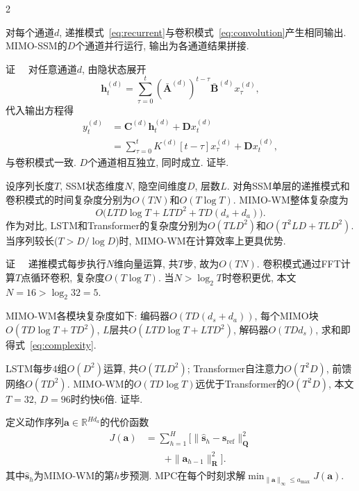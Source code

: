\begin{multicols}{2}
\begin{Thm}
\label{thm:equiv}
对每个通道$d$, 递推模式~\eqref{eq:recurrent}与卷积模式~\eqref{eq:convolution}产生相同输出.
MIMO-SSM的$D$个通道并行运行, 输出为各通道结果拼接.
\end{Thm}

{证}~~
对任意通道$d$, 由隐状态展开
\begin{equation}
{\bm h}_t^{(d)} = \sum_{\tau=0}^{t} (\bar{{\bm A}}^{(d)})^{t-\tau} \bar{{\bm B}}^{(d)} x_\tau^{(d)},
\end{equation}
代入输出方程得
\begin{equation}
\begin{aligned}
y_t^{(d)} &= {\bm C}^{(d)}{\bm h}_t^{(d)} + {\bm D}x_t^{(d)} \\
&= \sum_{\tau=0}^{t} K^{(d)}[t{-}\tau] x_\tau^{(d)} + {\bm D}x_t^{(d)},
\end{aligned}
\end{equation}
与卷积模式一致. $D$个通道相互独立, 同时成立. 证毕.
\begin{Thm}
\label{thm:complexity}
设序列长度$T$, SSM状态维度$N$, 隐空间维度$D$, 层数$L$.
对角SSM单层的递推模式和卷积模式的时间复杂度分别为$O(TN)$和$O(T\log T)$.
MIMO-WM整体复杂度为
\begin{equation}
\label{eq:complexity}
O\big(LTD\log T + LTD^2 + TD(d_s+d_a)\big).
\end{equation}
作为对比, LSTM和Transformer的复杂度分别为$O(TLD^2)$和$O(T^2LD+TLD^2)$.
当序列较长($T > D/\log D$)时, MIMO-WM在计算效率上更具优势.
\end{Thm}

{证}~~
递推模式每步执行$N$维向量运算, 共$T$步, 故为$O(TN)$.
卷积模式通过FFT计算$T$点循环卷积, 复杂度$O(T\log T)$.
当$N > \log_2 T$时卷积更优, 本文$N=16 > \log_2 32 = 5$.

MIMO-WM各模块复杂度如下:
编码器$O(TD(d_s+d_a))$, 每个MIMO块$O(TD\log T + TD^2)$,
$L$层共$O(LTD\log T + LTD^2)$, 解码器$O(TDd_s)$,
求和即得式~\eqref{eq:complexity}.

LSTM每步$4$组$O(D^2)$运算, 共$O(TLD^2)$;
Transformer自注意力$O(T^2D)$, 前馈网络$O(TD^2)$.
MIMO-WM的$O(TD\log T)$远优于Transformer的$O(T^2D)$,
本文$T=32$, $D=96$时约快$6$倍.
证毕.

\begin{Def}
\label{def:cem_cost}
定义动作序列${\bm a} \in \mathbb{R}^{Hd_a}$的代价函数
\begin{equation}
\begin{aligned}
J({\bm a}) &= \sum_{h=1}^{H}\Big[\|\hat{{\bm s}}_{h} - {\bm s}_{\text{ref}}\|_{{\bm Q}}^2 \\
&\qquad + \|{\bm a}_{h-1}\|_{{\bm R}}^2\Big].
\end{aligned}
\end{equation}
其中$\hat{{\bm s}}_{h}$为MIMO-WM的第$h$步预测.
MPC在每个时刻求解$\min_{\|{\bm a}\|_\infty \leqslant a_{\max}} J({\bm a})$.
\end{Def}


\end{multicols}
